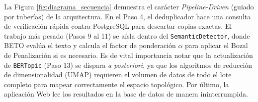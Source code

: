 La Figura \ref{fig:diagrama_secuencia} demuestra el carácter \textit{Pipeline-Driven} (guiado por tuberías) de la arquitectura. En el Paso 4, el deduplicador hace una consulta de verificación rápida contra PostgreSQL para descartar copias exactas. El trabajo más pesado (Pasos 9 al 11) se aísla dentro del \texttt{SemanticDetector}, donde BETO evalúa el texto y calcula el factor de ponderación $\alpha$ para aplicar el Bozal de Penalización si es necesario. Es de vital importancia notar que la actualización de \texttt{BERTopic} (Paso 13) se dispara \textit{a posteriori}, ya que los algoritmos de reducción de dimensionalidad (UMAP) requieren el volumen de datos de todo el lote completo para mapear correctamente el espacio topológico. Por último, la aplicación Web lee los resultados en la base de datos de manera ininterrumpida.
